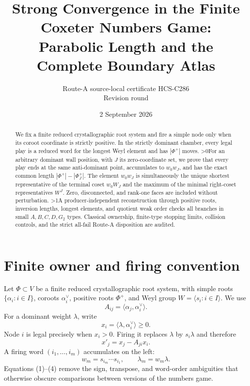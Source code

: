 \documentclass[10pt]{article}
\title{Strong Convergence in the Finite Coxeter Numbers Game:\\
Parabolic Length and the Complete Boundary Atlas}
\author{Route-A source-local certificate HCS-C286\\
Revision round \CRevisionRound}
\date{2 September 2026}
\providecommand{\CRevisionRound}{2}
\begin{document}
\maketitle

\begin{abstract}
We fix a finite reduced crystallographic root system and fire a simple node
only when its coroot coordinate is strictly positive.  In the strictly
dominant chamber, every legal play is a reduced word for the longest Weyl
element and has $|\Phi^+|$ moves.
\ifnum\CRevisionRound>0\space For an arbitrary dominant wall position, with
$J$ its zero-coordinate set, we prove that every play ends at the same
anti-dominant point, accumulates to $w_0w_J$, and has the exact common length
$|\Phi^+|-|\Phi_J^+|$.  The element $w_0w_J$ is simultaneously the unique
shortest representative of the terminal coset $w_0W_J$ and the maximum of
the minimal right-coset representatives $W^J$.  Zero, disconnected, and
rank-one faces are included without perturbation.\fi
\ifnum\CRevisionRound>1\space A producer-independent reconstruction through
positive roots, inversion lengths, longest elements, and quotient weak order
checks all branches in small $A,B,C,D,G_2$ types.  Classical ownership,
finite-type stopping limits, collision controls, and the strict all-fail
Route-A disposition are audited.\fi
\end{abstract}

\section{Finite owner and firing convention}

Let $\Phi\subset V$ be a finite reduced crystallographic root system, with
simple roots $\{\alpha_i:i\in I\}$, coroots $\alpha_i^\vee$, positive roots
$\Phi^+$, and Weyl group $W=\langle s_i:i\in I\rangle$.  We use
\begin{equation}
 A_{ij}=\langle\alpha_j,\alpha_i^\vee\rangle.             \tag{1}
\end{equation}
For a dominant weight $\lambda$, write
\begin{equation}
 x_i=\langle\lambda,\alpha_i^\vee\rangle\geq0.           \tag{2}
\end{equation}
Node $i$ is legal precisely when $x_i>0$.  Firing it replaces $\lambda$ by
$s_i\lambda$ and therefore
\begin{equation}
 x'_j=x_j-A_{ji}x_i.                                      \tag{3}
\end{equation}
A firing word $(i_1,\ldots,i_m)$ accumulates on the left:
\begin{equation}
 w_m=s_{i_m}\cdots s_{i_1},\qquad \lambda_m=w_m\lambda.  \tag{4}
\end{equation}
Equations (1)--(4) remove the sign, transpose, and word-order ambiguities
that otherwise obscure comparisons between versions of the numbers game.
\end{document}
